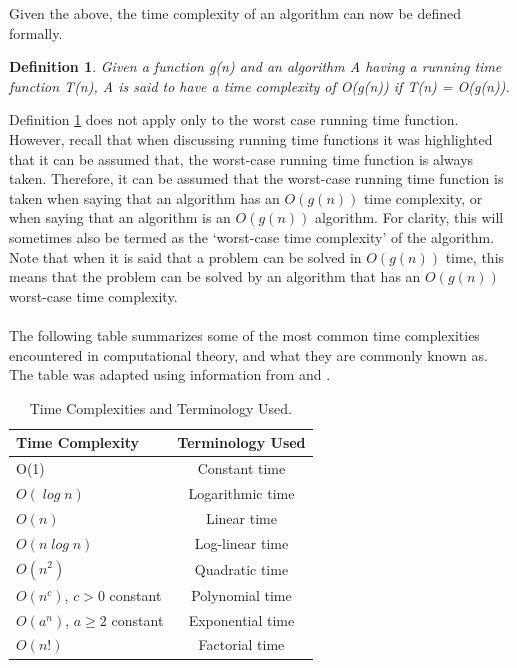 \documentclass[12pt]{article}
\newtheorem{definition}{Definition}[subsection]
\numberwithin{equation}{subsection}
\numberwithin{table}{subsection}
\numberwithin{algorithm}{subsection}
\begin{document}
Given the above, the time complexity of an algorithm can now be defined formally.
\begin{definition}
\label{time_complexity}
Given a function g(n) and an algorithm A having a running time function T(n), A is said to have a time complexity of O(g(n)) if T(n) = O(g(n)).  
\end{definition}
Definition \ref{time_complexity} does not apply only to the worst case running time function. However, recall that when discussing running time functions it was highlighted that it can be assumed that, the worst-case running time function is always taken. Therefore, it can be assumed that the worst-case running time function is taken when saying that an algorithm has an $\mathit{O(g(n))}$ time complexity, or when saying that an algorithm is an $\mathit{O(g(n))}$ algorithm. For clarity, this will sometimes also be termed as the `worst-case time complexity' of the algorithm. Note that when it is said that a problem can be solved in $\mathit{O(g(n))}$ time, this means that the problem can be solved by an algorithm that has an $\mathit{O(g(n))}$ worst-case time complexity.\\\\
The following table summarizes some of the most common time complexities encountered in computational theory, and what they are commonly known as. The table was adapted using information from \cite{pettis} and \cite{carter_1999}.
\begin{table}[!htbp]
  \begin{center}
    \caption{Time Complexities and Terminology Used.}
    \label{tab:table1}
    \begin{tabular}{l|c} %
      \textbf{Time Complexity} & \textbf{Terminology Used}\\
      \hline
      O(1)                          & Constant time    \\
     $O(\mathit{\log n})$          & Logarithmic time \\
     $O(\mathit{n})$               & Linear time      \\
     $O(\mathit{n \log n})$        & Log-linear time  \\
     $O(\mathit{n^2})$             & Quadratic time   \\
     $O(\mathit{n^c})$, $\mathit{c > 0}$ constant & Polynomial time  \\
     $O(\mathit{a^n})$, $\mathit{a \geq 2}$ constant & Exponential time \\
     $O(\mathit{n!})$              & Factorial time
    \end{tabular}
  \end{center}
\end{table}
\end{document}
